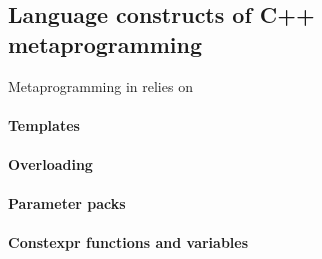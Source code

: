 \documentclass[../main]{subfiles}
\begin{document}
\subsection{Language constructs of C++ metaprogramming}

Metaprogramming in \cpp relies on

\paragraph{Templates}

\paragraph{Overloading}

\paragraph{Parameter packs}

\paragraph{Constexpr functions and variables}
\end{document}
